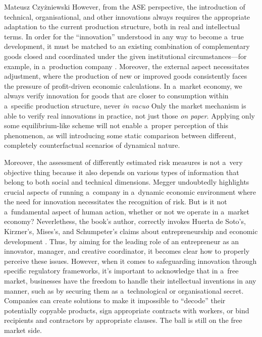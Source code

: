 \begin{newrevengenv}{Mateusz Czyżniewski}
However, from the ASE perspective, the introduction of technical, organisational, and other innovations always requires the appropriate adaptation to the current production structure, both in real and intellectual terms. In order for the ``innovation'' understood in any way to become a~true development, it must be matched to an existing combination of complementary goods closed and coordinated under the given institutional circumstances---for example, in a~production company 
\parencite[][]{bylund_explaining_2015}. %
 Moreover, the external aspect necessitates adjustment, where the production of new or improved goods consistently faces the pressure of profit-driven economic calculations. In a~market economy, we always verify innovation for goods that are closer to consumption within a~specific production structure, never \textit{in vacuo} 
\parencite[][pp.509–556 \mbox{[1962]}]{rothbard_man_2009} %
 Only the market mechanism is able to verify real innovations in practice, not just those \textit{on paper}. Applying only some equilibrium-like scheme will not enable a~proper perception of this phenomenon, as will introducing some static comparison between different, completely counterfactual scenarios of dynamical nature.



Moreover, the assessment of differently estimated risk measures is not a~very objective thing because it also depends on various types of information that belong to both social and technical dimensions. Megger undoubtedly highlights crucial aspects of running a~company in a~dynamic economic environment where the need for innovation necessitates the recognition of risk. But is it not a~fundamental aspect of human action, whether or not we operate in a~market economy? Neverlethess, the book's author, correctly invokes Huerta de Soto's, Kirzner's, Mises's, and Schumpeter's claims about entrepreneurship and economic development 
\parencite[][pp.99–100]{megger_sprawiedliwosc_2021}. %
 Thus, by aiming for the leading role of an entrepreneur as an innovator, manager, and creative coordinator, it becomes clear how to properly perceive these issues. However, when it comes to safeguarding innovation through specific regulatory frameworks, it's important to acknowledge that in a~free market, businesses have the freedom to handle their intellectual inventions in any manner, such as by securing them as a~technological or organisational secret. Companies can create solutions to make it impossible to ``decode'' their potentially copyable products, sign appropriate contracts with workers, or bind recipients and contractors by appropriate clauses. The ball is still on the free market side.




\end{newrevengenv}
